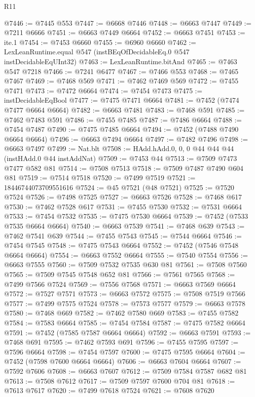 \begin{lexlean}{R11}
\begin{coremodule}
{{{{{{{{{{{{{{{{{{{{{{{{{{{{{{{{{{{{{{{{{{{{{{{{{{{{{{{{{{{{{{{{{{{{{{{{{{{{{{{{{{@7446 := @7445 @553
@7447 := @6668 @7446
@7448 := @6663 @7447
@7449 := @7211 @6666
@7451 := @6663 @7449 @6664
@7452 := @6663 @7451
@7453 := ite.{1}
@7454 := @7453 @6660
@7455 := @6960 @6660
@7462 := LexLeanRuntime.equal @547 (instBEqOfDecidableEq.{0} @547 instDecidableEqUInt32)
@7463 := LexLeanRuntime.bitAnd
@7465 := @7463 @547 @7218
@7466 := @7241 @6477
@7467 := @7466 @553
@7468 := @7465 @7467
@7469 := @7468 @569
@7471 := @7462 @7469 @569
@7472 := @7455 @7471
@7473 := @7472 @6664
@7474 := @7454 @7473
@7475 := instDecidableEqBool
@7477 := @7475 @7471 @6664
@7481 := @7452 (@7474 @7477 @6664 @6664)
@7482 := @6663 @7481
@7483 := @7468 @591
@7485 := @7462 @7483 @591
@7486 := @7455 @7485
@7487 := @7486 @6664
@7488 := @7454 @7487
@7490 := @7475 @7485 @6664
@7494 := @7452 (@7488 @7490 @6664 @6664)
@7496 := @6663 @7494 @6664
@7497 := @7482 @7496
@7498 := @6663 @7497
@7499 := Nat.blt
@7508 := HAdd.hAdd.{0, 0, 0} @44 @44 @44 (instHAdd.{0} @44 instAddNat)
@7509 := @7453 @44
@7513 := @7509 @7473 @7477 @582 @81
@7514 := @7508 @7513
@7518 := @7509 @7487 @7490 @604 @81
@7519 := @7514 @7518
@7520 := @7499 @7519
@7521 := 18446744073709551616
@7524 := @45 @7521 (@48 @7521)
@7525 := @7520 @7524
@7526 := @7498 @7525
@7527 := @6663 @7526
@7528 := @7468 @617
@7530 := @7462 @7528 @617
@7531 := @7455 @7530
@7532 := @7531 @6664
@7533 := @7454 @7532
@7535 := @7475 @7530 @6664
@7539 := @7452 (@7533 @7535 @6664 @6664)
@7540 := @6663 @7539
@7541 := @7468 @639
@7543 := @7462 @7541 @639
@7544 := @7455 @7543
@7545 := @7544 @6664
@7546 := @7454 @7545
@7548 := @7475 @7543 @6664
@7552 := @7452 (@7546 @7548 @6664 @6664)
@7554 := @6663 @7552 @6664
@7555 := @7540 @7554
@7556 := @6663 @7555
@7560 := @7509 @7532 @7535 @630 @81
@7561 := @7508 @7560
@7565 := @7509 @7545 @7548 @652 @81
@7566 := @7561 @7565
@7568 := @7499 @7566 @7524
@7569 := @7556 @7568
@7571 := @6663 @7569 @6664
@7572 := @7527 @7571
@7573 := @6663 @7572
@7575 := @7508 @7519 @7566
@7577 := @7499 @7575 @7524
@7578 := @7573 @7577
@7579 := @6663 @7578
@7580 := @7468 @669
@7582 := @7462 @7580 @669
@7583 := @7455 @7582
@7584 := @7583 @6664
@7585 := @7454 @7584
@7587 := @7475 @7582 @6664
@7591 := @7452 (@7585 @7587 @6664 @6664)
@7592 := @6663 @7591
@7593 := @7468 @691
@7595 := @7462 @7593 @691
@7596 := @7455 @7595
@7597 := @7596 @6664
@7598 := @7454 @7597
@7600 := @7475 @7595 @6664
@7604 := @7452 (@7598 @7600 @6664 @6664)
@7606 := @6663 @7604 @6664
@7607 := @7592 @7606
@7608 := @6663 @7607
@7612 := @7509 @7584 @7587 @682 @81
@7613 := @7508 @7612
@7617 := @7509 @7597 @7600 @704 @81
@7618 := @7613 @7617
@7620 := @7499 @7618 @7524
@7621 := @7608 @7620
}}}}}}}}}}}}}}}}}}}}}}}}}}}}}}}}}}}}}}}}}}}}}}}}}}}}}}}}}}}}}}}}}}}}}}}}}}}}}}}}}}
\end{coremodule}
\end{lexlean}
